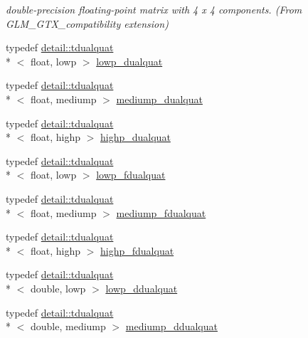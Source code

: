 \begin{DoxyCompactItemize}
\begin{DoxyCompactList}\small\item\em double-\/precision floating-\/point matrix with 4 x 4 components. (From G\-L\-M\-\_\-\-G\-T\-X\-\_\-compatibility extension) \end{DoxyCompactList}\item 
typedef \hyperlink{structglm_1_1detail_1_1tdualquat}{detail\-::tdualquat}\\*
$<$ float, lowp $>$ \hyperlink{group__gtc__dual__quaternion_gae1772179edc60f4e8b46c8772eeeccee}{lowp\-\_\-dualquat}
\item 
typedef \hyperlink{structglm_1_1detail_1_1tdualquat}{detail\-::tdualquat}\\*
$<$ float, mediump $>$ \hyperlink{group__gtc__dual__quaternion_ga71fc1c10a382330c1fee55ce29703405}{mediump\-\_\-dualquat}
\item 
typedef \hyperlink{structglm_1_1detail_1_1tdualquat}{detail\-::tdualquat}\\*
$<$ float, highp $>$ \hyperlink{group__gtc__dual__quaternion_gaf3a01deb502f53ca555ee1d45e6d6776}{highp\-\_\-dualquat}
\item 
typedef \hyperlink{structglm_1_1detail_1_1tdualquat}{detail\-::tdualquat}\\*
$<$ float, lowp $>$ \hyperlink{group__gtc__dual__quaternion_gae62c636c63c9eb3c1ea6d10f4b7d7c81}{lowp\-\_\-fdualquat}
\item 
typedef \hyperlink{structglm_1_1detail_1_1tdualquat}{detail\-::tdualquat}\\*
$<$ float, mediump $>$ \hyperlink{group__gtc__dual__quaternion_gab211d24786158490e57dfa57d7744f71}{mediump\-\_\-fdualquat}
\item 
typedef \hyperlink{structglm_1_1detail_1_1tdualquat}{detail\-::tdualquat}\\*
$<$ float, highp $>$ \hyperlink{group__gtc__dual__quaternion_ga2ed3283c09d3ffaf52a0e0a4b248eab6}{highp\-\_\-fdualquat}
\item 
typedef \hyperlink{structglm_1_1detail_1_1tdualquat}{detail\-::tdualquat}\\*
$<$ double, lowp $>$ \hyperlink{group__gtc__dual__quaternion_ga29461fddd543ffdf65a199fc28c42458}{lowp\-\_\-ddualquat}
\item 
typedef \hyperlink{structglm_1_1detail_1_1tdualquat}{detail\-::tdualquat}\\*
$<$ double, mediump $>$ \hyperlink{group__gtc__dual__quaternion_ga62d8cbf30e2afd0b1044204268a69066}{mediump\-\_\-ddualquat}
\item 

\end{DoxyCompactItemize}
